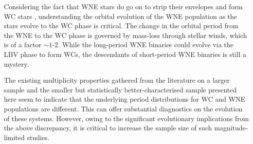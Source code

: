 

Considering the fact that WNE stars do go on to strip their envelopes and form WC stars \citep{2003MeynetMaeder}, understanding the orbital evolution of the WNE population as the stars evolve to the WC phase is critical. The change in the orbital period from the WNE to the WC phase is governed by mass-loss through stellar winds, which is of a factor ${\sim}1$-2. While the long-period WNE binaries could evolve via the LBV phase to form WCs, the descendants of short-period WNE binaries is still a mystery. 

The existing multiplicity properties gathered from the literature on a larger sample and the smaller but statistically better-characterised sample presented here seem to indicate that the underlying period distributions for WC and WNE populations are different. This can offer substantial diagnostics on the evolution of these systems. However, owing to the significant evolutionary implications from the above discrepancy, it is critical to increase the sample size of such magnitude-limited studies.